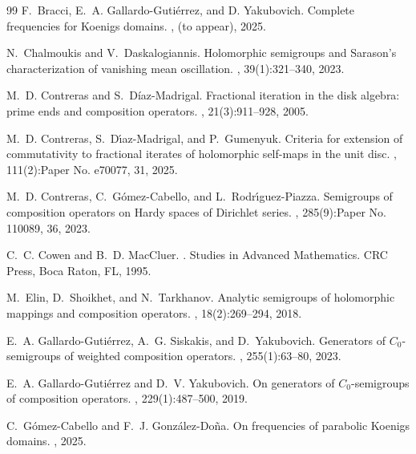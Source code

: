 \documentclass[11pt]{amsart}
\numberwithin{equation}{section}
\theoremstyle{definition}
\begin{document}
\begin{thebibliography}{99}
		F.~Bracci, E.~A. Gallardo-Guti{\'e}rrez, and D. Yakubovich.
		\newblock Complete frequencies for Koenigs domains.
		, (to appear), 2025.
		
		N.~Chalmoukis and V.~Daskalogiannis.
		\newblock Holomorphic semigroups and {S}arason's characterization of vanishing mean oscillation.
		, 39(1):321--340, 2023.
		
		M.~D. Contreras and S.~D\'{i}az-Madrigal.
		\newblock Fractional iteration in the disk algebra: prime ends and composition operators.
		, 21(3):911--928, 2005.
		
		M.~D. Contreras, S.~D\'{\i}az-Madrigal, and P.~Gumenyuk.
		\newblock Criteria for extension of commutativity to fractional iterates of holomorphic self-maps in the unit disc.
		, 111(2):Paper No. e70077, 31, 2025.
		
		M.~D. Contreras, C.~G\'{o}mez-Cabello, and L.~Rodr\'{\i}guez-Piazza.
		\newblock Semigroups of composition operators on {H}ardy spaces of {D}irichlet series.
		, 285(9):Paper No. 110089, 36, 2023.
		
		C.~C. Cowen and B.~D. MacCluer.
		.
		\newblock Studies in Advanced Mathematics. CRC Press, Boca Raton, FL, 1995.
		
		M.~Elin, D.~Shoikhet, and N.~Tarkhanov.
		\newblock Analytic semigroups of holomorphic mappings and composition operators.
		, 18(2):269--294, 2018.
		
		E.~A. Gallardo-Guti\'{e}rrez, A.~G. Siskakis, and D.~Yakubovich.
		\newblock Generators of {$C_0$}-semigroups of weighted composition operators.
		, 255(1):63--80, 2023.
		
		E.~A. Gallardo-Guti{\'e}rrez and D.~V. Yakubovich.
		\newblock On generators of {$C_0$}-semigroups of composition operators.
		, 229(1):487--500, 2019.
		
		C.~G{\'o}mez-Cabello and F.~J. Gonz{\'a}lez-Do{\~n}a.
		\newblock On frequencies of parabolic {K}oenigs domains.
		, 2025.
		

\end{thebibliography}
\end{document}
